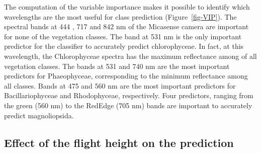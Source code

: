 \documentclass[
  number]{elsarticle}
\begin{document}
The computation of the variable importance makes it possible to identify
which wavelengths are the most useful for class prediction
(Figure~\ref{fig-VIP}). The spectral bands at 444 , 717 and 842 nm of
the Micasense camera are important for none of the vegetation classes.
The band at 531 nm is the only important predictor for the classifier to
accurately predict chlorophyceae. In fact, at this wavelength, the
Chlorophyceae spectra has the maximum reflectance among of all
vegetation classes. The bands at 531 and 740 nm are the most important
predictors for Phaeophyceae, corresponding to the minimum reflectance
among all classes. Bands at 475 and 560 nm are the most important
predictors for Bacillariophyceae and Rhodophyceae, respectively. Four
predictors, ranging from the green (560 nm) to the RedEdge (705 nm)
bands are important to accurately predict magnoliopsida.

\subsection{Effect of the flight height on the
prediction}\label{effect-of-the-flight-height-on-the-prediction}
\end{document}
